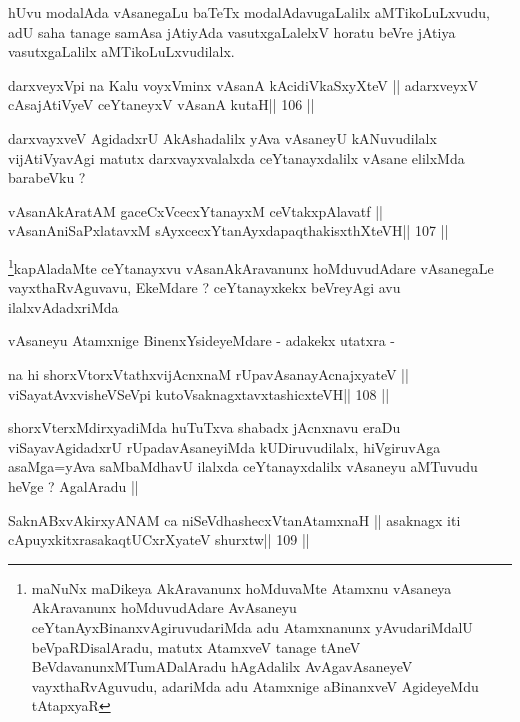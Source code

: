 \begin{artha}
hUvu modalAda vAsanegaLu baTeTx modalAdavugaLalilx aMTikoLuLxvudu, adU
saha tanage samAsa jAtiyAda vasutxgaLalelxV horatu beVre jAtiya
vasutxgaLalilx aMTikoLuLxvudilalx.
\end{artha}

\begin{shl}
darxveyxV\s pi na Kalu voyxVminx vAsanA kAcidiVkaSxyXteV ||
adarxveyxV cAsajAtiVyeV ceYtaneyxV vAsanA kutaH\hfill || 106 ||
\end{shl}

\begin{artha}
darxvayxveV AgidadxrU AkAshadalilx yAva vAsaneyU kANuvudilalx
vijAtiVyavAgi matutx darxvayxvalalxda ceYtanayxdalilx vAsane elilxMda
barabeVku ?
\end{artha}

\begin{shl}
vAsanAkAratAM gaceCxVcecxYtanayxM ceVtakxpAlavatf ||
vAsanAniSaPxlatavxM sAyxcecxYtanAyxdapaqthakisxthXteVH\hfill || 107 ||
\end{shl}

\begin{artha}
\footnote[1]{maNuNx maDikeya AkAravanunx hoMduvaMte Atamxnu vAsaneya
  AkAravanunx hoMduvudAdare AvAsaneyu ceYtanAyxBinanxvAgiruvudariMda
  adu Atamxnanunx yAvudariMdalU beVpaRDisalAradu, matutx AtamxveV
  tanage tAneV BeVdavanunxMTumADalAradu hAgAdalilx AvAgavAsaneyeV
  vayxthaRvAguvudu, adariMda adu Atamxnige aBinanxveV AgideyeMdu tAtapxyaR}kapAladaMte ceYtanayxvu vAsanAkAravanunx hoMduvudAdare
vAsanegaLe vayxthaRvAguvavu, EkeMdare ? ceYtanayxkekx beVreyAgi avu
ilalxvAdadxriMda

vAsaneyu Atamxnige BinenxYsideyeMdare - adakekx utatxra -
\end{artha}

\begin{shl}
na hi shorxVtorxVtathxvijAcnxnaM rUpavAsanayA\s cnajxyateV ||
viSayatAvxvisheVSeV\s pi kutoV\s saknagxtavxtashicxteVH\hfill || 108 ||
\end{shl}

\begin{artha}
shorxVterxMdirxyadiMda huTuTxva shabadx jAcnxnavu eraDu
viSayavAgidadxrU rUpadavAsaneyiMda kUDiruvudilalx, hiVgiruvAga
asaMga=yAva saMbaMdhavU ilalxda ceYtanayxdalilx vAsaneyu aMTuvudu
heVge ? AgalAradu ||
\end{artha}

\begin{shl}
SaknABxvAkirxyANAM ca niSeVdhashecxVtanAtamxnaH ||
asaknagx iti cApuyxkitxrasakaqtUCxrXyateV shurxtw\hfill || 109 ||
\end{shl}

